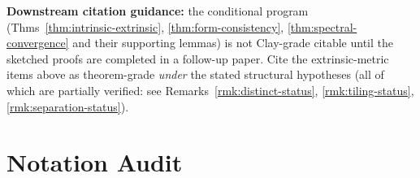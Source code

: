 \documentclass[11pt, a4paper]{amsart}
\theoremstyle{definition}
\begin{document}
\textbf{Downstream citation guidance:} the conditional program
(Thms~\ref{thm:intrinsic-extrinsic},
\ref{thm:form-consistency}, \ref{thm:spectral-convergence} and
their supporting lemmas) is not Clay-grade citable until the
sketched proofs are completed in a follow-up paper. Cite the
extrinsic-metric items above as theorem-grade \emph{under} the
stated structural hypotheses (all of which are partially
verified: see Remarks~\ref{rmk:distinct-status},
\ref{rmk:tiling-status}, \ref{rmk:separation-status}).

\section{Notation Audit}
\label{sec:notation}
\end{document}
